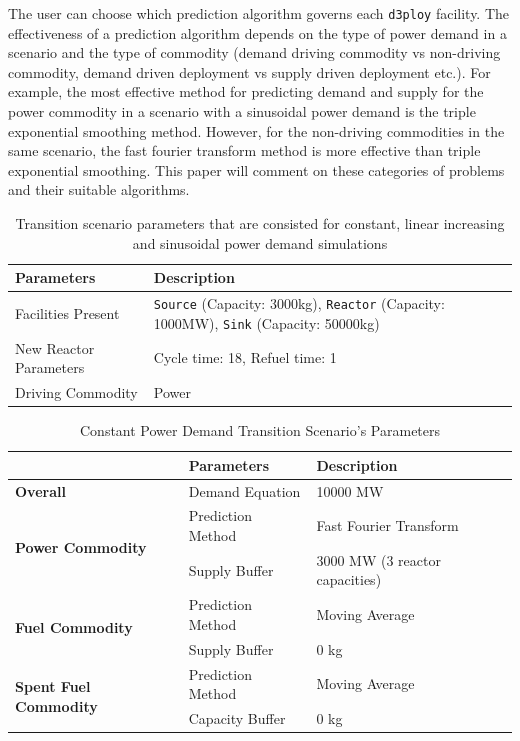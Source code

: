 \documentclass{anstrans}
\newcommand{\deploy}{\texttt{d3ploy}\xspace}%
\begin{document}
The user can choose which prediction algorithm governs each
\deploy facility. 
The effectiveness of a prediction algorithm depends on the type 
of power demand in a scenario and the type of commodity (demand 
driving commodity vs non-driving commodity, demand driven 
deployment vs supply driven deployment etc.). 
For example, the most effective method
for predicting demand and supply for the power commodity in a scenario  
with a sinusoidal power demand is the triple exponential smoothing method. 
However, for the non-driving commodities in the same 
scenario, the fast fourier transform method is more effective than triple 
exponential smoothing. 
This paper will comment on these categories of problems and their suitable
algorithms. 

\begin{table}[!htb]
    \centering
    \caption {Transition scenario parameters that are consisted for constant, linear increasing and sinusoidal power demand simulations}
	\label{tab:transition-scenario-all}
    \begin{tabular}{|l|p{4.5cm}|}
    \hline
    \textbf{Parameters}    & \textbf{Description} \\ \hline
    Facilities Present     & \texttt{Source} (Capacity: 3000kg), \texttt{Reactor} (Capacity: 1000MW), \texttt{Sink} (Capacity: 50000kg)      \\ \hline
    New Reactor Parameters & Cycle time: 18, Refuel time: 1\\ \hline
    Driving Commodity & Power \\ \hline
    \end{tabular}
\end{table}

\begin{table}[!htb]
    \centering
    \caption {Constant Power Demand Transition Scenario's Parameters}
	\label{tab:transition-scenario-constant-power}
    \begin{tabular}{|l|l|p{4.5cm}|}
    \hline
                                     & \textbf{Parameters}    & \textbf{Description} \\ \hline
    \textbf{Overall}& Demand Equation & 10000 MW \\ \hline
    \multirow{2}{*}{\textbf{Power Commodity}} & Prediction Method      &  Fast Fourier Transform\\ \cline{2-3} 
                                     & Supply Buffer          &  3000 MW (3 reactor capacities)\\ \hline
    \multirow{2}{*}{\textbf{Fuel Commodity}}  & Prediction Method      &  Moving Average\\ \cline{2-3}
                                     & Supply Buffer & 0 kg \\ \hline
    \multirow{2}{*}{\textbf{Spent Fuel Commodity}}  & Prediction Method      &  Moving Average\\ \cline{2-3}
                                     & Capacity Buffer & 0 kg \\ \hline
    \end{tabular}
\end{table}
\end{document}
